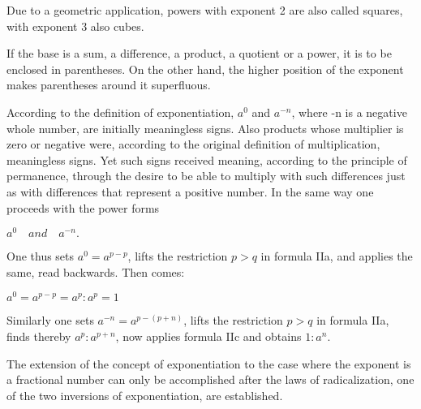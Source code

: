 Due to a geometric application, powers with exponent 2 are also called squares, with exponent 3 also cubes.

If the base is a sum, a difference, a product, a quotient or a power, it is to be enclosed in parentheses. On the other hand, the higher position of the exponent makes parentheses around it superfluous.

According to the definition of exponentiation, $a^0$ and $a^{-n}$, where -n is a negative whole number, are initially meaningless signs. Also products whose multiplier is zero or negative were, according to the original definition of multiplication, meaningless signs. Yet such signs received meaning, according to the principle of permanence, through the desire to be able to multiply with such differences just as with differences that represent a positive number. In the same way one proceeds with the power forms

\vspace{-0.3cm}
\begin{center}
$a^0 \quad and \quad a^{-n}.$
\end{center}
\vspace{-0.3cm}

One thus sets $a^0 = a^{p-p}$, lifts the restriction $p > q$ in formula IIa, and applies the same, read backwards. Then comes:

\vspace{-0.3cm}
\begin{center}
    $a^0 = a^{p-p} = a^p : a^p = 1$
\end{center}
\vspace{-0.2cm}

Similarly one sets $a^{-n} = a^{p-(p+n)}$, lifts the restriction $p > q$ in formula IIa, finds thereby $a^p : a^{p+n}$, now applies formula IIc and obtains $1:a^n$.

The extension of the concept of exponentiation to the case where the exponent is a fractional number can only be accomplished after the laws of radicalization, one of the two inversions of exponentiation, are established.
